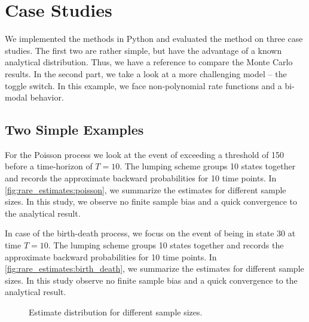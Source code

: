 \section{Case Studies}
We implemented the methods in Python and evaluated the method on three case studies.
The first two are rather simple, but have the advantage of a known analytical distribution.
Thus, we have a reference to compare the Monte Carlo results.
In the second part, we take a look at a more challenging model -- the toggle switch.
In this example, we face non-polynomial rate functions and a bi-modal behavior.
\subsection{Two Simple Examples}
For the Poisson process we look at the event of exceeding a threshold of \num{150} before a time-horizon of $T=10$.
The lumping scheme groups \num{10} states together and records the approximate backward probabilities for \num{10} time points.
In \autoref{fig:rare_estimates:poisson}, we summarize the estimates for different sample sizes.
In this study, we observe no finite sample bias and a quick convergence to the analytical result.

In case of the birth-death process, we focus on the event of being in state \num{30} at time $T=10$.
The lumping scheme groups \num{10} states together and records the approximate backward probabilities for \num{10} time points.
In \autoref{fig:rare_estimates:birth_death}, we summarize the estimates for different sample sizes.
In this study observe no finite sample bias and a quick convergence to the analytical result.
\begin{figure}[htb]
    \centering
    \caption[Estimates for different sample sizes]{\label{fig:rare_estimates}Estimate distribution for different sample sizes.}
\end{figure}
